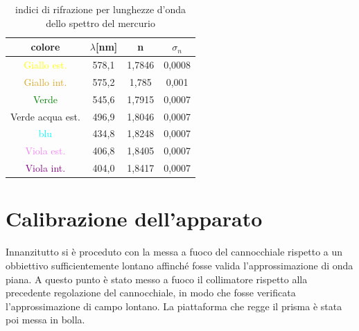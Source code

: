 \documentclass{article}
\begin{document}
        \begin{table}[H]

            \centering
            \begin{tabular}{c c c c}

                \toprule 
                \textbf{colore} & \textbf{$\lambda$[nm]}  & \textbf{n} & \textbf{$\sigma_n$}  \\

                \midrule
                \textcolor{yellow}{Giallo est.}	            &	578,1	&	1,7846 &   0,0008 \\
                \textcolor{Goldenrod}{Giallo int.}     	    &	575,2	&	1,785  &   0,001  \\
                \textcolor{green}{Verde}                 	&	545,6	&	1,7915 &   0,0007 \\
                \textcolor{Emerald}{Verde acqua est.}	    &	496,9	&   1,8046 &   0,0007 \\
                \textcolor{cyan}{blu}                    	&	434,8	&   1,8248 &   0,0007 \\
                \textcolor{violet}{Viola est.}             	&	406,8	&   1,8405 &   0,0007 \\
                \textcolor{purple}{Viola int.}	            &	404,0	&   1,8417 &   0,0007 \\
                \bottomrule

            \end{tabular}
            
            \caption{indici di rifrazione per lunghezze d'onda dello spettro del mercurio}
            \label{tabular:spettro}

        \end{table}


    \section{Calibrazione dell'apparato}

        Innanzitutto si è proceduto con la messa a fuoco del cannocchiale rispetto a un obbiettivo sufficientemente lontano 
        affinché fosse valida l'approssimazione di onda piana. A questo punto è stato messo a fuoco il collimatore 
        rispetto alla precedente regolazione del cannocchiale, in modo che fosse verificata l'approssimazione di campo lontano. 
        La piattaforma che regge il prisma è stata poi messa in bolla. \\
\end{document}

